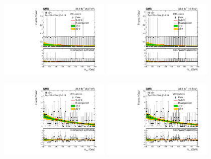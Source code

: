 \begin{figure}[h!]
    \begin{center}
        \includegraphics[width=0.47\textwidth]{figures/appendix_mass_plots/CMS-HIG-16-040_Figure_013-a.pdf}
        \includegraphics[width=0.47\textwidth]{figures/appendix_mass_plots/SBplots_jackWSnewOldTTHZHLeptonicTag_13TeV.pdf}
    \end{center}
    \begin{center}
        \includegraphics[width=0.47\textwidth]{figures/appendix_mass_plots/CMS-HIG-16-040_Figure_013-b.pdf}
        \includegraphics[width=0.47\textwidth]{figures/appendix_mass_plots/SBplots_jackWSnewOldTTHWHLeptonicTag_13TeV.pdf}
    \end{center}
    \begin{center}

\end{center}
\end{figure}
